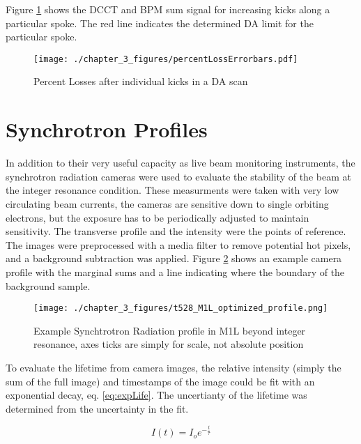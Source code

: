 Figure \ref{fig:daLimit} shows the DCCT and BPM sum signal for increasing kicks along a particular spoke. The red line indicates the determined DA limit for the particular spoke.

\begin{figure}
	\centering
	\texttt{[image: ./chapter\_3\_figures/percentLossErrorbars.pdf]}
	\caption{Percent Losses after individual kicks in a DA scan}
	\label{fig:daLimit}
\end{figure}

\section{Synchrotron Profiles} \label{sec:synchProfiles}
In addition to their very useful capacity as live beam monitoring instruments, the synchrotron radiation cameras were used to evaluate the stability of the beam at the integer resonance condition. These measurments were taken with very low circulating beam currents, the cameras are sensitive down to single orbiting electrons, but the exposure has to be periodically adjusted to maintain sensitivity. The transverse profile and the intensity were the points of reference. The images were preprocessed with a media filter to remove potential hot pixels, and a background subtraction was applied. Figure \ref{fig:synchBackground} shows an example camera profile with the marginal sums and a line indicating where the boundary of the background sample.

\begin{figure}
	\centering
	\texttt{[image: ./chapter\_3\_figures/t528\_M1L\_optimized\_profile.png]}
	\caption{Example Synchtrotron Radiation profile in M1L beyond integer resonance, axes ticks are simply for scale, not absolute position}
	\label{fig:synchBackground}
\end{figure}

To evaluate the lifetime from camera images, the relative intensity (simply the sum of the full image) and timestamps of the image could be fit with an exponential decay, eq. \ref{eq:expLife}. The uncertianty of the lifetime was determined from the uncertainty in the fit.

\begin{equation}
	I(t) = I_o e^{-\frac{t}{\tau}}
	\label{eq:expLife}
\end{equation}
